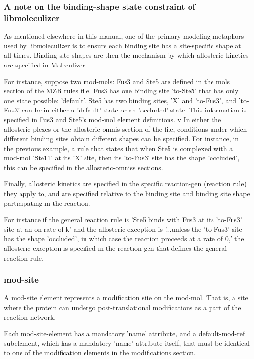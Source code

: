 \subsubsection{A note on the binding-shape state constraint of
  libmoleculizer}
As mentioned elsewhere in this manual, one of the primary modeling
metaphors used by libmoleculizer is to ensure each binding site has a
site-specific shape at all times.  Binding site shapes are then the
mechanism by which allosteric kinetics are specified in Moleculizer.

For instance, suppose two mod-mols: Fus3 and Ste5 are defined in the
mols section of the MZR rules file.  Fus3 has one binding site
'to-Ste5' that has only one state possible: 'default'.  Ste5 has two
binding sites, 'X' and 'to-Fus3', and 'to-Fus3' can be in either a
'default' state or an 'occluded' state.  This information is specified
in Fus3 and Ste5's mod-mol element definitions.
v
In either the allosteric-plexes or the allosteric-omnis section of the
file, conditions under which different binding sites obtain different
shapes can be specified.  For instance, in the previous example, a
rule that states that when Ste5 is complexed with a mod-mol 'Ste11' at
its 'X' site, then its 'to-Fus3' site has the shape 'occluded', this
can be specified in the allosteric-omniss sections.  

Finally, allosteric kinetics are specified in the specific
reaction-gen (reaction rule) they apply to, and are specified relative
to the binding site and binding site shape participating in the
reaction.

For instance if the general reaction rule is 'Ste5 binds with
Fus3 at its 'to-Fus3' site at an on rate of k' and the allosteric
exception is '...unless the 'to-Fus3' site has the shape 'occluded',
in which case the reaction proceeds at a rate of 0,' the allosteric
exception is specified in the reaction gen that defines the general
reaction rule.

\subsubsection{mod-site}
A mod-site element represents a modification site on the mod-mol.
That is, a site where the protein can undergo post-translational
modifications as a part of the reaction network.  

Each mod-site-element has a mandatory 'name' attribute, and a
default-mod-ref subelement, which has a mandatory 'name' attribute
itself, that must be identical to one of the modification elements in
the modifications section.

